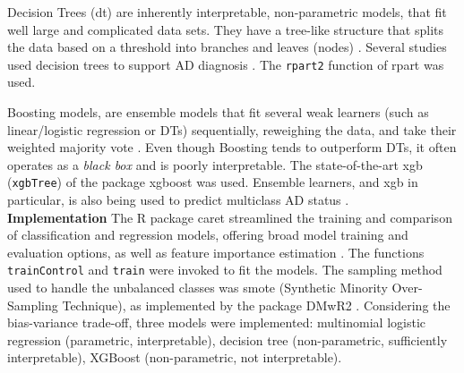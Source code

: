 \documentclass{amsart}
\begin{document}
Decision Trees (\acrshort{dt}) are inherently interpretable, non-parametric models, that fit well large and complicated data sets. They have a tree-like structure that splits the data based on a threshold into branches and leaves (nodes) \cite{Song2015DecisionPrediction}. Several studies used decision trees to support AD diagnosis \cite{saputra2020detecting,dana2014using,kumar2017new,mofrad2019decision}. The \texttt{rpart2} \cite{rpart} function of \textsf{rpart} was used.

Boosting models, are ensemble models that fit several weak learners (such as linear/logistic regression or DTs) sequentially, reweighing the data, and take their weighted majority vote \cite{Friedman2000boosting,Friedman2001gbm}. Even though Boosting tends to outperform DTs, it often operates as a \textit{black box} and is poorly interpretable. The state-of-the-art \acrlong{xgb} (\texttt{xgbTree}) of the package \textsf{xgboost} \cite{Chen2016XGBoost:System} was used. Ensemble learners, and \acrshort{xgb} in particular, is also being used to predict multiclass AD status \cite{zhang2024multiclass,app13148298}.\\

\leavevmode\newline \textbf{Implementation}\hspace{.25cm} 
The R package \textsf{caret} streamlined the training and comparison of classification and regression models, offering broad model training and evaluation options, as well as feature importance estimation \cite{Kuhn2008BuildingPackage}. The functions \texttt{trainControl} and \texttt{train} were invoked to fit the models. The sampling method used to handle the unbalanced classes was \acrshort{smote} (Synthetic Minority Over-Sampling Technique), as implemented by the package \textsf{DMwR2} \cite{DMwR2}. Considering the bias-variance trade-off, three models were implemented: multinomial logistic regression (parametric, interpretable), decision tree (non-parametric, sufficiently interpretable), XGBoost (non-parametric, not interpretable).
\end{document}
